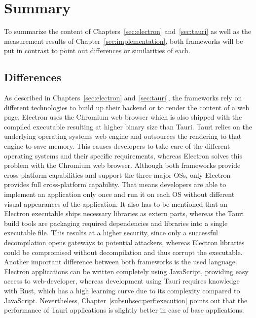 \section{Summary}
\label{sec:summary}
To summarize the content of Chapters~\ref{sec:electron} and~\ref{sec:tauri} as well as the measurement results of Chapter~\ref{sec:implementation},
both frameworks will be put in contrast to point out differences or similarities of each.
\subsection{Differences}\label{subsec:differences}
As described in Chapters~\ref{sec:electron} and~\ref{sec:tauri}, the frameworks rely on different technologies to build up their backend or to render the content of a web page.
Electron uses the Chromium web browser which is also shipped with the compiled executable resulting at higher binary size than Tauri.
Tauri relies on the underlying operating systems web engine and outsources the rendering to that engine to save memory.
This causes developers to take care of the different operating systems and their specific requirements, whereas Electron solves this problem with the Chromium web browser.
Although both frameworks provide cross-platform capabilities and support the three major \ac{OS}s, only Electron provides full cross-platform capability.
That means developers are able to implement an application only once and run it on each \ac{OS} without different visual appearances of the application.
It also has to be mentioned that an Electron executable ships necessary libraries as extern parts, whereas the Tauri build tools are packaging required dependencies and libraries into a single executable file.
This results at a higher security, since only a successful decompilation opens gateways to potential attackers, whereas Electron libraries could be compromised without decompilation and thus corrupt the executable.
Another important difference between both frameworks is the used language.
Electron applications can be written completely using JavaScript, providing easy access to web-developer, whereas development using Tauri requires knowledge with Rust, which has a high learning curve due to its complexity compared to JavaScript.
Nevertheless, Chapter~\ref{subsubsec:perf:execution} points out that the performance of Tauri applications is slightly better in case of base applications.
